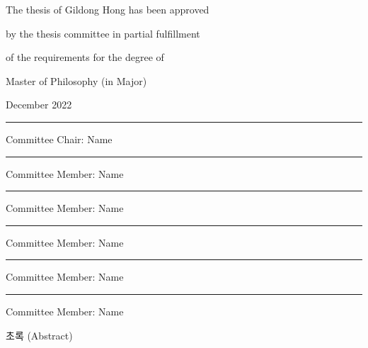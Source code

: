 \documentclass[11pt]{report}
\numberwithin{figure}{section}
\theoremstyle{plain}
\theoremstyle{definition}
\theoremstyle{corollary}
\theoremstyle{definition}
\theoremstyle{plain}
\theoremstyle{definition}
\theoremstyle{plain}
\begin{document}
\newpage
\begin{center}
\Large
The thesis of Gildong Hong has been approved \par
by the thesis committee in partial fulfillment\par
of the requirements for the degree of \par
Master of Philosophy (in Major) 

\par\vspace{50pt}

\large December 2022

\par\vspace{50pt}

\rule{.6\textwidth}{0.4pt}\par
Committee Chair: Name

\par\vspace{20pt}
 
\rule{.6\textwidth}{0.4pt}\par
Committee Member: Name
 
\par\vspace{20pt}

\rule{.6\textwidth}{0.4pt}\par
Committee Member: Name 
 
\par\vspace{20pt}

\rule{.6\textwidth}{0.4pt}\par
Committee Member: Name 
 
\par\vspace{20pt}

\rule{.6\textwidth}{0.4pt}\par
Committee Member: Name 
 
\par\vspace{20pt}

\rule{.6\textwidth}{0.4pt}\par
Committee Member: Name 
\end{center}

\newpage
{}

\begin{center}
\large 초록 (Abstract)
\end{center}
\end{document}
